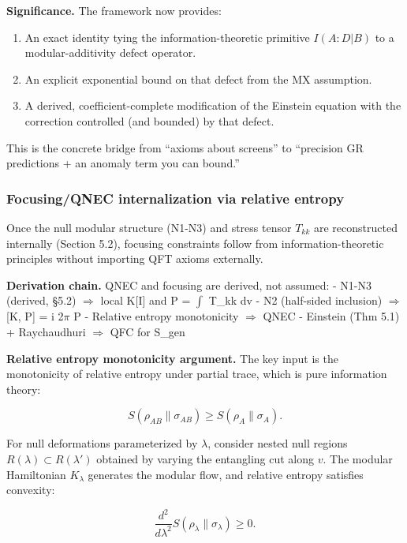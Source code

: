\documentclass[11pt,a4paper]{article}
\theoremstyle{remark}
\providecommand{\tightlist}{%
  \setlength{\itemsep}{0pt}\setlength{\parskip}{0pt}}
\begin{document}
\textbf{Significance.} The framework now provides:

\begin{enumerate}
\def\labelenumi{\arabic{enumi}.}
\tightlist
\item
  An exact identity tying the information-theoretic primitive \(I(A:D|B)\) to a
  modular-additivity defect operator.
\item
  An explicit exponential bound on that defect from the MX assumption.
\item
  A derived, coefficient-complete modification of the Einstein equation with
  the correction controlled (and bounded) by that defect.
\end{enumerate}

This is the concrete bridge from ``axioms about screens'' to ``precision GR
predictions + an anomaly term you can bound.''

\subsubsection{Focusing/QNEC internalization via relative entropy}\label{focusingqnec-internalization-via-relative-entropy}

Once the null modular structure (N1-N3) and stress tensor \(T_{kk}\) are
reconstructed internally (Section 5.2), focusing constraints follow from
information-theoretic principles without importing QFT axioms externally.

\textbf{Derivation chain.} QNEC and focusing are derived, not assumed:
- N1-N3 (derived, §5.2) \ensuremath{\Longrightarrow} local K{[}I{]} and P = \ensuremath{\int} T\_kk dv
- N2 (half-sided inclusion) \ensuremath{\Longrightarrow} {[}K, P{]} = i 2\ensuremath{\pi} P
- Relative entropy monotonicity \ensuremath{\Longrightarrow} QNEC
- Einstein (Thm 5.1) + Raychaudhuri \ensuremath{\Longrightarrow} QFC for S\_gen

\textbf{Relative entropy monotonicity argument.} The key input is the monotonicity
of relative entropy under partial trace, which is pure information theory:

\[
S(\rho_{AB} \| \sigma_{AB}) \ge S(\rho_A \| \sigma_A).
\]

For null deformations parameterized by \(\lambda\), consider nested null regions
\(R(\lambda) \subset R(\lambda')\) obtained by varying the entangling cut along
\(v\). The modular Hamiltonian \(K_\lambda\) generates the modular flow, and
relative entropy satisfies convexity:

\[
\frac{d^2}{d\lambda^2} S(\rho_\lambda \| \sigma_\lambda) \ge 0.
\]
\end{document}
